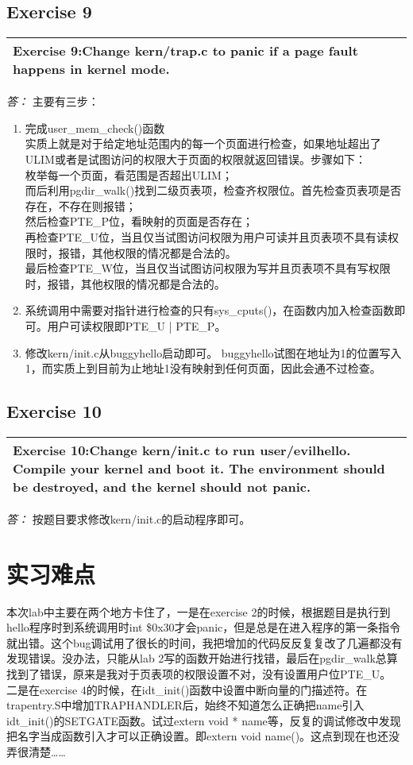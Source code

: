 \documentclass[11pt,a4paper]{article}
\newcommand{\exercise}[2]{
\begin{tabular}{|p{\textwidth}|}
\hline
Exercise #1:#2\\
\hline
\end{tabular}
\textit{\large{答：}}}
\begin{document}
\subsection{Exercise 9}
\exercise{9}{Change kern/trap.c to panic if a page fault happens in kernel mode. }
主要有三步：
\begin{enumerate}
\item 完成user\_mem\_check()函数\\
实质上就是对于给定地址范围内的每一个页面进行检查，如果地址超出了ULIM或者是试图访问的权限大于页面的权限就返回错误。步骤如下：\\
枚举每一个页面，看范围是否超出ULIM；\\
而后利用pgdir\_walk()找到二级页表项，检查齐权限位。首先检查页表项是否存在，不存在则报错；\\
然后检查PTE\_P位，看映射的页面是否存在；\\
再检查PTE\_U位，当且仅当试图访问权限为用户可读并且页表项不具有读权限时，报错，其他权限的情况都是合法的。\\
最后检查PTE\_W位，当且仅当试图访问权限为写并且页表项不具有写权限时，报错，其他权限的情况都是合法的。\\
\item 系统调用中需要对指针进行检查的只有sys\_cputs()，在函数内加入检查函数即可。用户可读权限即PTE\_U | PTE\_P。
\item 修改kern/init.c从buggyhello启动即可。
buggyhello试图在地址为1的位置写入1，而实质上到目前为止地址1没有映射到任何页面，因此会通不过检查。\\
\end{enumerate}

\subsection{Exercise 10}
\exercise{10}{Change kern/init.c to run user/evilhello. Compile your kernel and boot it. The environment should be destroyed, and the kernel should not panic.}
按题目要求修改kern/init.c的启动程序即可。

\section{实习难点}
本次lab中主要在两个地方卡住了，一是在exercise 2的时候，根据题目是执行到hello程序时到系统调用时int \$0x30才会panic，但是总是在进入程序的第一条指令就出错。这个bug调试用了很长的时间，我把增加的代码反反复复改了几遍都没有发现错误。没办法，只能从lab 2写的函数开始进行找错，最后在pgdir\_walk总算找到了错误，原来是我对于页表项的权限设置不对，没有设置用户位PTE\_U。\\
二是在exercise 4的时候，在idt\_init()函数中设置中断向量的门描述符。在trapentry.S中增加TRAPHANDLER后，始终不知道怎么正确把name引入idt\_init()的SETGATE函数。试过extern void * name等，反复的调试修改中发现把名字当成函数引入才可以正确设置。即extern void name()。这点到现在也还没弄很清楚……\\
\end{document}
